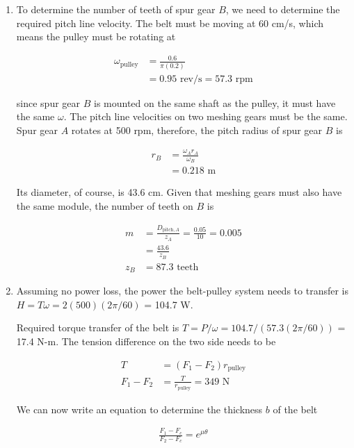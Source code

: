 \documentclass[a4paper,openany,svgnames]{kaobook}
\begin{document}
\begin{enumerate}
\item To determine the number of teeth of spur gear \(B\), we need to determine the required pitch line velocity. The belt must be moving at 60 cm/s, which means the pulley must be rotating at

\begin{align*}
     \omega_{\text{pulley}} &= \frac{0.6}{\pi (0.2)} \\
                            &= 0.95 \text{ rev/s} = 57.3 \text{ rpm}
   \end{align*}

since spur gear \(B\) is mounted on the same shaft as the pulley, it must have the same \(\omega\). The pitch line velocities on two meshing gears must be the same. Spur gear \(A\) rotates at 500 rpm, therefore, the pitch radius of spur gear \(B\) is

\begin{align*}
     r_{B} &= \frac{\omega_{A} r_{A}}{\omega_{B}} \\
           &= 0.218 \text{ m}
   \end{align*}

Its diameter, of course, is 43.6 cm. Given that
meshing gears must also have the same module, the number of teeth on \(B\) is

\begin{align*}
     m &= \frac{D_{\text{pitch},A}}{z_{A}} = \frac{0.05}{10} = 0.005 \\
       &= \frac{43.6}{z_{B}} \\
     z_{B} &= 87.3 \text{ teeth}
   \end{align*}

\item Assuming no power loss, the power the belt-pulley system needs to transfer is \(H = T\omega = 2(500)(2\pi/60)\) = 104.7 W.

Required torque transfer of the belt is \(T = P/\omega = 104.7/(57.3(2\pi/60))\) = 17.4 N-m. The tension difference on the two side needs to be

\begin{align*}
     T &= (F_{1} - F_{2})r_{\text{pulley}} \\
     F_{1} - F_{2} &= \frac{T}{r_{\text{pulley}}} = 349 \text{ N}
   \end{align*}

We can now write an equation to determine the thickness \(b\) of the belt

\begin{align*}
  \frac{F_{1} - F_{c}}{F_{2} - F_{c}} = e^{\mu \theta}
\end{align*}


\end{enumerate}
\end{document}
